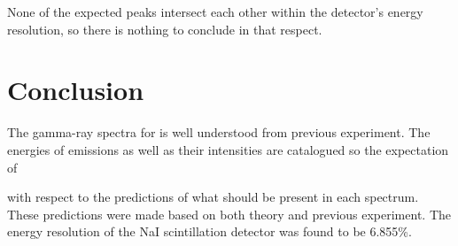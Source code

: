 \documentclass[11pt]{article}
\numberwithin{equation}{section}
\numberwithin{figure}{section}
\numberwithin{table}{section}
\begin{document}
None of the expected peaks intersect each other within the detector's energy resolution, so there is nothing to conclude in that respect. 

\section{Conclusion}\label{sec:Conclusion}
The gamma-ray spectra for  is well understood from previous experiment. The energies of emissions as well as their intensities are catalogued so the expectation of 


with respect to the predictions of what should be present in each spectrum. These predictions were made based on both theory and previous experiment. The energy resolution of the NaI scintillation detector was found to be 6.855\%.

\newpage
\printbibliography
\end{document}
